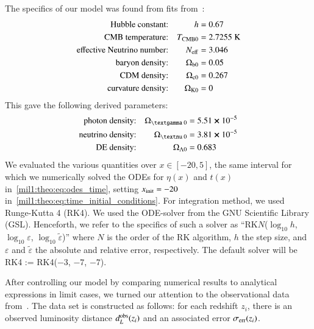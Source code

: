 The specifics of our model was found from fits from~\citet{Planckdata}:
\begin{equation}\label{mil1:imp:eq:fiducials}
    \begin{split}
        \text{Hubble constant:}&& h &=0.67 \\
        \text{CMB temperature:}&& \TCMB &=2.7255\text{~K} \\
        \text{effective Neutrino number:}&& N\ped{eff}&=3.046\\
        \text{baryon density:}&& \Omega\ped{b 0}&=0.05\\
        \text{CDM density:}&& \Omega\ped{c 0}&=0.267\\
        \text{curvature density:}&& \OmgK&=0
    \end{split}
\end{equation}
This gave the following derived parameters:
\begin{equation}\label{mil1:imp:eq:derived_fiducials}
    \begin{split}
        \text{photon density:}&& \Omega\gped{\textgamma 0}&=5.51 \cross 10^{-5}\\
        \text{neutrino density:}&& \Omega\gped{\textnu 0}&=3.81 \cross 10^{-5}\\
        \text{DE density:}&& \OmgL&=0.683
    \end{split}
\end{equation}
We evaluated the various quantities over $x \in [-20, 5]$, the same interval for which we numerically solved the ODEs for $\eta(x)$ and $t(x)$ in~\cref{mil1:theo:eq:odes_time}, setting $x_\mathrm{init}=-20$ in~\cref{mil1:theo:eq:time_initial_conditions}. For integration method, we used Runge-Kutta 4 (RK4). We used the ODE-solver from the GNU Scientific Library (GSL). Henceforth, we refer to the specifics of such a solver as ``RK$N$($\log_{10}{h}$, $\log_{10}{\varepsilon}$, $\log_{10}{\tilde{\varepsilon}}$)'' where $N$ is the order of the RK algorithm, $h$ the step size, and $\varepsilon$ and $\tilde{\varepsilon}$ the absolute and relative error, respectively. The default solver will be RK4 := RK4($-3$, $-7$, $-7$). 

After controlling our model by comparing numerical results to analytical expressions in limit cases, we turned our attention to the observational data from~\citet{supernovadata}. The data set is constructed as follows: for each redshift $z_i$, there is an observed luminosity distance $d_L^\mathrm{obs}(z_i)$ and an associated error $\sigma_\mathrm{err}(z_i)$. %

